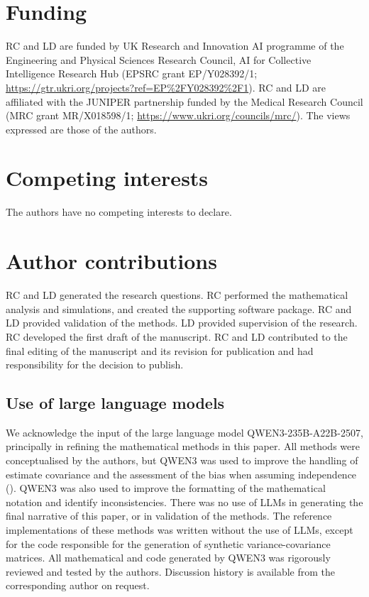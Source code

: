 \documentclass[10pt,letterpaper]{article}
\begin{document}
\nolinenumbers



\section*{Funding}

RC and LD are funded by UK Research and Innovation AI programme of the Engineering and Physical Sciences Research Council, AI for Collective Intelligence Research Hub (EPSRC grant EP/Y028392/1;  \url{https://gtr.ukri.org/projects?ref=EP%2FY028392%2F1}). RC and LD are affiliated with the JUNIPER partnership funded by the Medical Research Council (MRC grant MR/X018598/1; \url{https://www.ukri.org/councils/mrc/}). The views expressed are those of the authors.

\section*{Competing interests}

The authors have no competing interests to declare.

\section*{Author contributions}

RC and LD generated the research questions. RC performed the mathematical analysis and simulations, and created the supporting software package. RC and LD provided validation of the methods. LD provided supervision of the research. RC developed the first draft of the manuscript. RC and LD contributed to the final editing of the manuscript and its revision for publication and had responsibility for the decision to publish.

\subsection*{Use of large language models}

We acknowledge the input of the large language model QWEN3-235B-A22B-2507, principally in refining the mathematical methods in this paper. All methods were conceptualised by the authors, but QWEN3 was used to improve the handling of estimate covariance and the assessment of the bias when assuming independence (). QWEN3 was also used to improve the formatting of the mathematical notation and identify inconsistencies. There was no use of LLMs in generating the final narrative of this paper, or in validation of the methods. The reference implementations of these methods was written without the use of LLMs, except for the code responsible for the generation of synthetic variance-covariance matrices. All mathematical and code generated by QWEN3 was rigorously reviewed and tested by the authors. Discussion history is available from the corresponding author on request.
\end{document}
